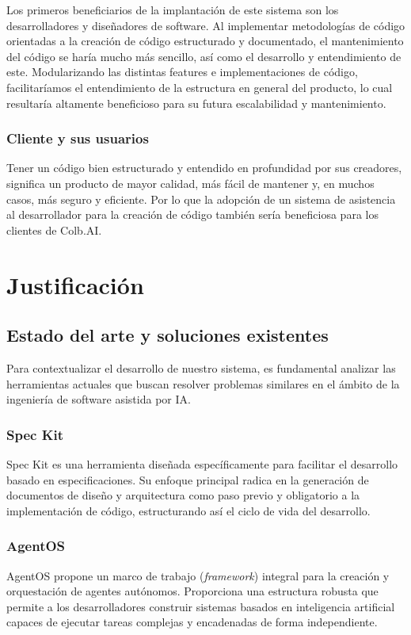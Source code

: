 \documentclass[11pt, letterpaper]{article}
\begin{document}
Los primeros beneficiarios de la implantación de este sistema son los desarrolladores y diseñadores de software. Al implementar metodologías de código orientadas a la creación de código estructurado y documentado, el mantenimiento del código se haría mucho más sencillo, así como el desarrollo y entendimiento de este. Modularizando las distintas features e implementaciones de código, facilitaríamos el entendimiento de la estructura en general del producto, lo cual resultaría altamente beneficioso para su futura escalabilidad y mantenimiento.

\subsubsection{Cliente y sus usuarios}

Tener un código bien estructurado y entendido en profundidad por sus creadores, significa un producto de mayor calidad, más fácil de mantener y, en muchos casos, más seguro y eficiente. Por lo que la adopción de un sistema de asistencia al desarrollador para la creación de código también sería beneficiosa para los clientes de Colb.AI.

\newpage

\section{Justificación}

\subsection{Estado del arte y soluciones existentes}
Para contextualizar el desarrollo de nuestro sistema, es fundamental analizar las herramientas actuales que buscan resolver problemas similares en el ámbito de la ingeniería de software asistida por IA.

\subsubsection{Spec Kit}
Spec Kit es una herramienta diseñada específicamente para facilitar el desarrollo basado en especificaciones. Su enfoque principal radica en la generación de documentos de diseño y arquitectura como paso previo y obligatorio a la implementación de código, estructurando así el ciclo de vida del desarrollo. \cite{github_spec_kit}

\subsubsection{AgentOS}
AgentOS propone un marco de trabajo (\textit{framework}) integral para la creación y orquestación de agentes autónomos. Proporciona una estructura robusta que permite a los desarrolladores construir sistemas basados en inteligencia artificial capaces de ejecutar tareas complejas y encadenadas de forma independiente. \cite{buildermethods_agent_os} \cite{yao_react_2023}
\end{document}
